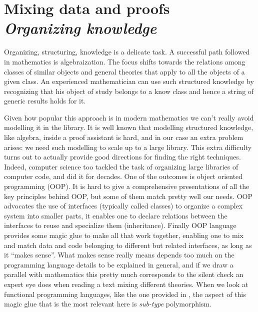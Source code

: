 \chapter[Mixing data and proofs]{Mixing data and proofs\\[2ex]\Large\itshape Organizing knowledge}

Organizing, structuring, knowledge is a delicate task. A successful
path followed in mathematics is algebraization. The focus shifts
towards the relations among classes of similar objects and general
theories that apply to all the objects of a given class.
An experienced mathematician can use such structured
knowledge by recognizing that his object of study belongs to a know
class and hence a string of generic results holds for it.

Given how popular this approach is in modern mathematics we can't
really avoid modelling it in the \mcbMC{} library.  It is well known that
modelling structured knowledge, like algebra, inside a proof assistant
is hard, and in our case an extra problem arises: we need such
modelling to scale up to a large library. This extra difficulty turns
out to actually provide good directions for finding the right
techniques.  Indeed, computer science too tackled the task of
organizing large libraries of computer code, and did it for decades.
One of the outcomes is object oriented programming (OOP).
It is hard to give a comprehensive presentations of all the key
principles behind OOP, but some of them match pretty well our needs.
OOP advocates the use of interfaces (typically called classes) to
organize a complex system into smaller parts, it enables one
to declare relations between the interfaces to reuse and
specialize them (inheritance).  Finally OOP language provides some
magic glue to make all that work together, enabling one to mix and
match data and code belonging to different but related interfaces, as
long as it ``makes sense''.  What makes sense really means depends too
much on the programming language details to be explained in general,
and if we draw a parallel with mathematics this pretty much
corresponds to the silent check an expert eye does when reading a text
mixing different theories.
When we look at functional programming languages, like the one
provided in \mcbCIC{}, the aspect of this magic glue that is the most
relevant here is \emph{sub-type} polymorphism. 

